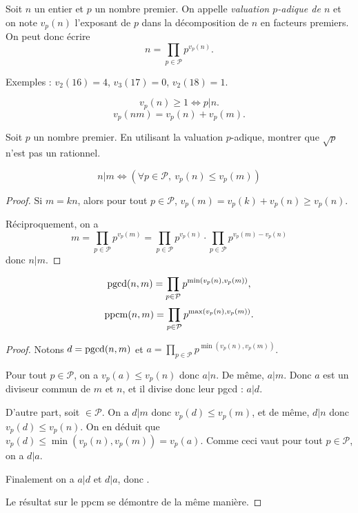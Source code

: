\begin{definition}
Soit $n$ un entier et $p$ un nombre premier. On appelle \emph{valuation $p$-adique de $n$} et on note $v_p(n)$ l'exposant de $p$ dans la décomposition de $n$ en facteurs premiers. On peut donc écrire 
\[ n = \prod_{p\in \mathcal P} p^{v_p(n)}.\]
\end{definition}

Exemples : $v_2(16)=4$, $v_3(17)=0$, $v_2(18)=1$.

\begin{proposition}
\[ v_p(n)\geq 1 \iff p|n.\]
\[ v_p(nm) = v_p(n)+v_p(m).\]
\end{proposition}


\begin{exercice}
Soit $p$ un nombre premier. En utilisant la valuation $p$-adique, montrer que $\sqrt p$ n'est pas un rationnel. 
\end{exercice}

\begin{proposition}
\[ 
n|m \iff \left(\forall p\in \mathcal P, \: v_p(n)\leq v_p(m)\right)
\]
\end{proposition}
\begin{proof}
Si $m = kn$, alors pour tout $p\in \mathcal P$, $v_p(m) = v_p(k)+v_p(n) \geq v_p(n)$.

Réciproquement, on a 
\[ 
m
= \prod_{p\in\mathcal P}p^{v_p(m)}
= \prod_{p\in\mathcal P}p^{v_p(n)} \cdot \prod_{p\in\mathcal P}p^{v_p(m)-v_p(n)}
\]
donc $n|m$.
\end{proof}

\begin{corollaire}
\[
\operatorname{pgcd}(n,m) = \prod_{p\in\mathcal P}p^{\min(v_p(n),v_p(m))},
\]
\[
\operatorname{ppcm}(n,m) = \prod_{p\in\mathcal P}p^{\max(v_p(n),v_p(m))}.
\]
\end{corollaire}
\begin{proof}
Notons $d=\operatorname{pgcd}(n,m)$ et $a = \prod_{p\in\mathcal P}p^{\min(v_p(n),v_p(m))}$.

Pour tout $p\in \mathcal P$, on a $v_p(a) \leq v_p(n)$ donc $a|n$. De même, $a|m$. Donc $a$ est un diviseur commun de $m$ et $n$, et il divise donc leur pgcd : $a|d$.

D'autre part, soit $\in \mathcal P$. On a $d|m$ donc $v_p(d)\leq v_p(m)$, et de même, $d|n$ donc $v_p(d)\leq v_p(n)$. On en déduit que $v_p(d) \leq \min(v_p(n),v_p(m)) = v_p(a)$. Comme ceci vaut pour tout $p\in \mathcal P$, on a $d|a$.

Finalement on a $a|d$ et $d|a$, donc .

Le résultat sur le ppcm se démontre de la même manière.
\end{proof}

